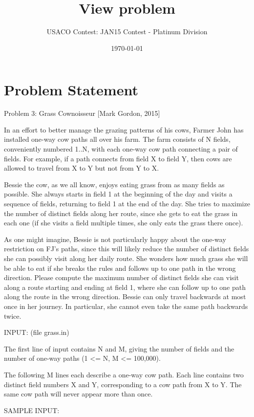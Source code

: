 \documentclass[12pt]{article}
\title{View problem}
\author{USACO Contest: JAN15 Contest - Platinum Division}
\date{\today}
\begin{document}
\maketitle

\section*{Problem Statement}

Problem 3: Grass Cownoisseur [Mark Gordon, 2015]

In an effort to better manage the grazing patterns of his cows, Farmer
John has installed one-way cow paths all over his farm.  The farm
consists of N fields, conveniently numbered 1..N, with each one-way
cow path connecting a pair of fields.  For example, if a path connects
from field X to field Y, then cows are allowed to travel from X to Y
but not from Y to X.

Bessie the cow, as we all know, enjoys eating grass from as many
fields as possible.  She always starts in field 1 at the beginning of
the day and visits a sequence of fields, returning to field 1 at the
end of the day.  She tries to maximize the number of distinct fields
along her route, since she gets to eat the grass in each one (if she
visits a field multiple times, she only eats the grass there once).

As one might imagine, Bessie is not particularly happy about the
one-way restriction on FJ's paths, since this will likely reduce the
number of distinct fields she can possibly visit along her daily
route.  She wonders how much grass she will be able to eat if she
breaks the rules and follows up to one path in the wrong direction.
Please compute the maximum number of distinct fields she can visit
along a route starting and ending at field 1, where she can follow up
to one path along the route in the wrong direction.  Bessie can only
travel backwards at most once in her journey.  In particular, she
cannot even take the same path backwards twice.

INPUT: (file grass.in)

The first line of input contains N and M, giving the number of fields
and the number of one-way paths (1 <= N, M <= 100,000).

The following M lines each describe a one-way cow path.  Each line
contains two distinct field numbers X and Y, corresponding to a cow
path from X to Y.  The same cow path will never appear more than once.

SAMPLE INPUT:
\end{document}
